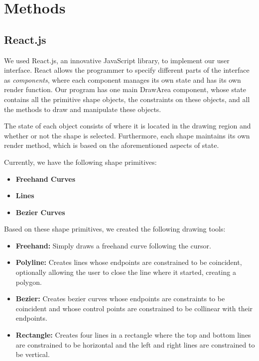 \section{Methods}



\subsection*{React.js}

We used React.js, an innovative JavaScript library, to implement our user interface. React allows the programmer to specify different parts of the interface as {\it components}, where each component manages its own state and has its own render function. Our program has one main DrawArea component, whose state contains all the primitive shape objects, the constraints on these objects, and all the methods to draw and manipulate these objects.

The state of each object consists of where it is located in the drawing region and whether or not the shape is selected. Furthermore, each shape maintains its own render method, which is based on the aforementioned aspects of state.

Currently, we have the following shape primitives:

\begin{itemize}
\item {\bf Freehand Curves}
\item {\bf Lines}
\item {\bf Bezier Curves}
\end{itemize}

Based on these shape primitives, we created the following drawing tools:

\begin{itemize}
\item {\bf Freehand:} Simply draws a freehand curve following the cursor.
\item {\bf Polyline:} Creates lines whose endpoints are constrained to be coincident, optionally allowing the user to close the line where it started, creating a polygon.
\item {\bf Bezier:} Creates bezier curves whose endpoints are constraints to be coincident and whose control points are constrained to be collinear with their endpoints.
\item {\bf Rectangle:} Creates four lines in a rectangle where the top and bottom lines are constrained to be horizontal and the left and right lines are constrained to be vertical.
\end{itemize}

